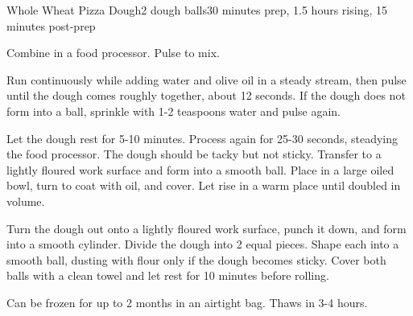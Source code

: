\documentclass[../Cookbook.tex]{subfiles}
\begin{document}
\begin{recipe}{Whole Wheat Pizza Dough}{2 dough balls}{30 minutes prep, 1.5 hours rising, 15 minutes post-prep}

Combine in a food processor. Pulse to mix.

Run continuously while adding water and olive oil in a steady stream, then pulse until the dough comes roughly together, about 12 seconds. If the dough does not form into a ball, sprinkle with 1-2 teaspoons water and pulse again.

\newstep
Let the dough rest for 5-10 minutes. Process again for 25-30 seconds, steadying the food processor. The dough should be tacky but not sticky. Transfer to a lightly floured work surface and form into a smooth ball.
Place in a large oiled bowl, turn to coat with oil, and cover.
Let rise in a warm place until doubled in volume.

\newstep
Turn the dough out onto a lightly floured work surface, punch it down, and form into a smooth cylinder. Divide the dough into 2 equal pieces. Shape each into a smooth ball, dusting with flour only if the dough becomes sticky. Cover both balls with a clean towel and let rest for 10 minutes before rolling.



Can be frozen for up to 2 months in an airtight bag. Thaws in 3-4 hours.

\end{recipe}
\end{document}
